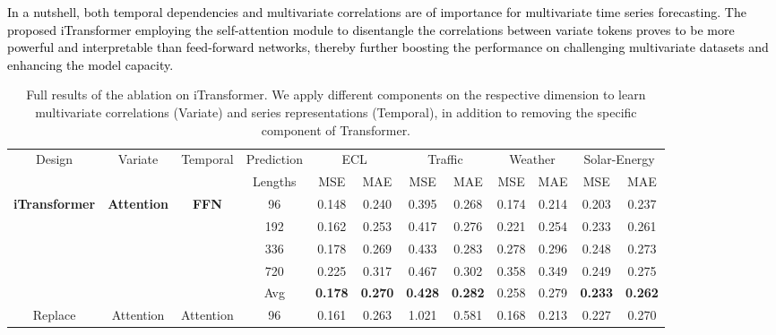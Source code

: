 \documentclass{article} %
\newcommand{\update}[1]{{\textcolor{black}{#1}}}
\begin{document}
\update{In a nutshell, both temporal dependencies and multivariate correlations are of importance for multivariate time series forecasting. The proposed iTransformer employing the self-attention module to disentangle the correlations between variate tokens proves to be more powerful and interpretable than feed-forward networks, thereby further boosting the performance on challenging multivariate datasets and enhancing the model capacity.}

\begin{table}[htbp]
\caption{Full results of the ablation on iTransformer. We apply different components on the respective dimension to learn multivariate correlations (Variate) and series representations (Temporal), in addition to removing the specific component of Transformer.}
\vspace{3pt}
\label{tab:full_ablation}
\centering
\begin{small}
    \renewcommand{\multirowsetup}{\centering}
    \setlength{\tabcolsep}{3.0pt}
    \begin{tabular}{c|c|c|c|cc|cc|cc|cc}
    \toprule
    \multirow{2}{*}{Design} &\multirow{2}{*}{Variate} & \multirow{2}{*}{Temporal} & Prediction & \multicolumn{2}{c|}{ECL} & \multicolumn{2}{c|}{Traffic} & \multicolumn{2}{c|}{Weather} & \multicolumn{2}{c}{Solar-Energy}\\
    \cmidrule(lr){5-6} \cmidrule(lr){7-8}  \cmidrule(lr){9-10} \cmidrule(lr){11-12} 
    & & &Lengths & MSE & MAE & MSE & MAE  & MSE & MAE & MSE & MAE \\
    \midrule
    \multirow{5}{*}{\textbf{iTransformer}}& \multirow{5}{*}{\textbf{Attention}} & \multirow{5}{*}{\textbf{FFN}} & 96 & 0.148 & 0.240 & 0.395 & 0.268 & 0.174 & 0.214 & 0.203 & 0.237\\
    & & & 192 & 0.162 & 0.253 & 0.417 & 0.276 & 0.221 & 0.254 & 0.233 & 0.261\\
    & & & 336 & 0.178 & 0.269 & 0.433 & 0.283 & 0.278 & 0.296 & 0.248 & 0.273\\
    & & & 720 & 0.225 & 0.317 & 0.467 & 0.302 & 0.358 & 0.349 & 0.249 & 0.275\\
    \cmidrule(lr){4-12}
     & & & Avg & \textbf{0.178} & \textbf{0.270} & \textbf{0.428} & \textbf{0.282} & 0.258 & 0.279 & \textbf{0.233} & \textbf{0.262}\\
     \midrule
     \multirow{15}{*}{Replace}& \multirow{5}{*}{Attention} & \multirow{5}{*}{Attention} & 96 & 0.161 & 0.263 & 1.021 & 0.581 & 0.168 & 0.213 & 0.227 & 0.270\\

\end{tabular}
\end{small}
\end{table}
\end{document}
